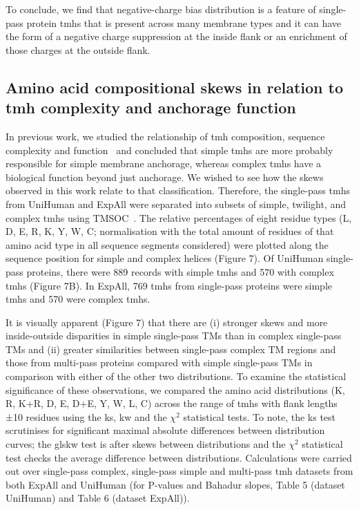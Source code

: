 To conclude, we find that negative-charge bias distribution is a feature of single-pass protein \gls{tmh}s that is present across many membrane types and it can have the form of a negative charge suppression at the inside flank or an enrichment of those charges at the outside flank.

\subsection{Amino acid compositional skews in relation to \gls{tmh} complexity and anchorage function}

In previous work, we studied the relationship of \gls{tmh} composition, sequence complexity and function~\cite{Wong2010, Wong2011, Wong2012} and concluded that simple \gls{tmh}s are more probably responsible for simple membrane anchorage, whereas complex \gls{tmh}s have a biological function beyond just anchorage. We wished to see how the skews observed in this work relate to that classification. Therefore, the single-pass \gls{tmh}s from UniHuman and ExpAll were separated into subsets of simple, twilight, and complex \gls{tmh}s using TMSOC~\cite{Wong2011, Wong2012}. The relative percentages of eight residue types (L, D, E, R, K, Y, W, C\@; normalisation with the total amount of residues of that amino acid type in all sequence segments considered) were plotted along the sequence position for simple and complex helices (Figure 7). Of UniHuman single-pass proteins, there were 889 records with simple \gls{tmh}s and 570 with complex \gls{tmh}s (Figure 7B). In ExpAll, 769 \gls{tmh}s from single-pass proteins were simple \gls{tmh}s and 570 were complex \gls{tmh}s.

It is visually apparent (Figure 7) that there are (i) stronger skews and more inside-outside disparities in simple single-pass TMs than in complex single-pass TMs and (ii) greater similarities between single-pass complex TM regions and those from multi-pass proteins compared with simple single-pass TMs in comparison with either of the other two distributions. To examine the statistical significance of these observations, we compared the amino acid distributions (K, R, K+R, D, E, D+E, Y, W, L, C) across the range of \gls{tmh}s with flank lengths ±10 residues using the \gls{ks}, \gls{kw} and the \({\chi}^{2}\) statistical tests. To note, the \gls{ks} test scrutinises for significant maximal absolute differences between distribution curves; the gls{kw} test is after skews between distributions and the \({\chi}^{2}\) statistical test checks the average difference between distributions. Calculations were carried out over single-pass complex, single-pass simple and multi-pass \gls{tmh} datasets from both ExpAll and UniHuman (for P-values and Bahadur slopes, Table 5 (dataset UniHuman) and Table 6 (dataset ExpAll)).


